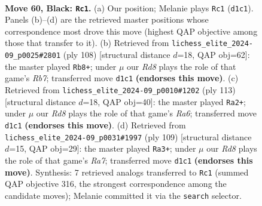 \documentclass[11pt]{article}
\begin{document}
\clearpage

\begin{figure}[p]\centering
\begin{subfigure}{0.46\textwidth}\centering
\resizebox{\linewidth}{!}{%
\newchessgame
\chessboard[
  setfen={8/3R2p1/5pk1/7p/2NP3P/6P1/7K/3r4 b - - 14 60},
  showmover=false,
  pgfstyle=straightmove, color=movearrow, markmove={d1-c1}
]}
\caption{}
\end{subfigure}\hfill
\begin{subfigure}{0.46\textwidth}\centering
\resizebox{\linewidth}{!}{%
\newchessgame
\chessboard[
  setfen={5k2/1R4p1/7p/7P/1p3P1K/1r4P1/8/8 w - - 6 55},
  showmover=false,
  pgfstyle=straightmove, color=movearrow, markmove={b7-b8}
]}
\caption{}
\end{subfigure}
\\[4pt]
\begin{subfigure}{0.46\textwidth}\centering
\resizebox{\linewidth}{!}{%
\newchessgame
\chessboard[
  setfen={R7/P7/5pp1/4p1k1/4P3/r4PP1/6K1/8 b - - 2 57},
  showmover=false,
  pgfstyle=straightmove, color=movearrow, markmove={a3-a2}
]}
\caption{}
\end{subfigure}\hfill
\begin{subfigure}{0.46\textwidth}\centering
\resizebox{\linewidth}{!}{%
\newchessgame
\chessboard[
  setfen={R7/P7/5pp1/5k1p/7P/4KP2/r7/8 b - - 6 55},
  showmover=false,
  pgfstyle=straightmove, color=movearrow, markmove={a2-a3}
]}
\caption{}
\end{subfigure}
\caption{\textbf{Move 60, Black: \texttt{Rc1}.} (a) Our position; Melanie plays \texttt{Rc1} (\texttt{d1c1}). Panels (b)--(d) are the retrieved master positions whose correspondence most drove this move (highest QAP objective among those that transfer to it). (b) Retrieved from \texttt{lichess\_elite\_2024-09\_p0025\#2801} (ply 108) [structural distance $d$=18, QAP obj=62]: the master played \texttt{Rb8+}; under $\mu$ our \emph{Rd8} plays the role of that game's \emph{Rb7}; transferred move \texttt{d1c1} \textbf{(endorses this move)}. (c) Retrieved from \texttt{lichess\_elite\_2024-09\_p0010\#1202} (ply 113) [structural distance $d$=18, QAP obj=40]: the master played \texttt{Ra2+}; under $\mu$ our \emph{Rd8} plays the role of that game's \emph{Ra6}; transferred move \texttt{d1c1} \textbf{(endorses this move)}. (d) Retrieved from \texttt{lichess\_elite\_2024-09\_p0031\#1997} (ply 109) [structural distance $d$=15, QAP obj=29]: the master played \texttt{Ra3+}; under $\mu$ our \emph{Rd8} plays the role of that game's \emph{Ra7}; transferred move \texttt{d1c1} \textbf{(endorses this move)}. Synthesis: 7 retrieved analogs transferred to \texttt{Rc1} (summed QAP objective 316, the strongest correspondence among the candidate moves); Melanie committed it via the \texttt{search} selector.}
\label{fig:thought-m119}
\end{figure}
\end{document}
